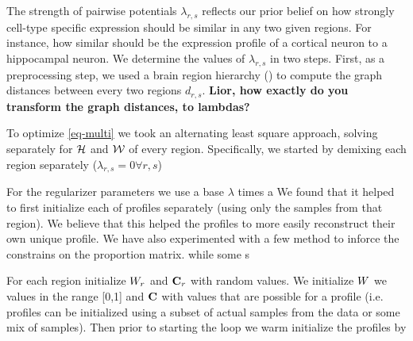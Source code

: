 The strength of pairwise potentials $\lambda_{r,s}$ reflects our prior belief on how strongly cell-type specific expression should be similar in any two given regions. For instance, how similar should be the expression profile of a cortical neuron to a hippocampal neuron.
We determine the values of $\lambda_{r,s}$ in two steps. First, as a preprocessing step, we used a brain region hierarchy () to compute the graph distances between every two regions $d_{r,s}$. {\bf{ Lior, how exactly do you transform the graph distances, to lambdas?}}




To optimize \eqref{eq-multi} we took an alternating least square approach, solving separately for ${\cal{H}}$ and ${\cal{W}}$ of every region. Specifically, we started by demixing each region separately ($\lambda_{r,s}=0 \forall r,s$)


For the regularizer parameters we use a base $\lambda$ times a 
We found that it helped to first initialize each of profiles separately (using only the samples from that region). We believe that this helped the profiles to more easily reconstruct their own unique profile.
We have also experimented with a few method to inforce the constrains on the proportion matrix. while some s

For each region initialize $W_r$ and $\mathbf{C}_r$ with random values. We initialize $W$ we values in the range [0,1] and $\mathbf{C}$ with values that are possible for a profile (i.e. profiles can be initialized using a subset of actual samples from the data or some mix of samples). Then prior to starting the loop we warm initialize the profiles by



